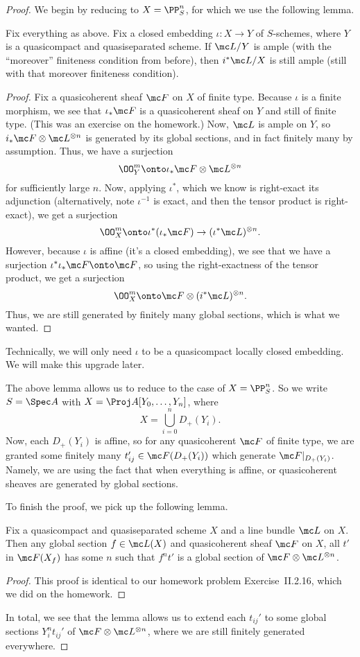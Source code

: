 \documentclass[../notes.tex]{subfiles}
\begin{document}
\begin{proof}
	We begin by reducing to $X=\PP^n_S$, for which we use the following lemma.
	\begin{lemma} %
		Fix everything as above. Fix a closed embedding $\iota\colon X\to Y$ of $S$-schemes, where $Y$ is a quasicompact and quasiseparated scheme. If $\mc L/Y$ is ample (with the ``moreover'' finiteness condition from before), then $i^*\mc L/X$ is still ample (still with that moreover finiteness condition).
	\end{lemma}
	\begin{proof}
		Fix a quasicoherent sheaf $\mc F$ on $X$ of finite type. Because $\iota$ is a finite morphism, we see that $\iota_*\mc F$ is a quasicoherent sheaf on $Y$ and still of finite type. (This was an exercise on the homework.) Now, $\mc L$ is ample on $Y$, so $i_*\mc F\otimes\mc L^{\otimes n}$ is generated by its global sections, and in fact finitely many by assumption. Thus, we have a surjection
		\[\OO_Y^m\onto\iota_*\mc F\otimes\mc L^{\otimes n}\]
		for sufficiently large $n$. Now, applying $\iota^*$, which we know is right-exact its adjunction (alternatively, note $\iota^{-1}$ is exact, and then the tensor product is right-exact), we get a surjection
		\[\OO_X^m\onto\iota^*(\iota_*\mc F)\to(\iota^*\mc L)^{\otimes n}.\]
		However, because $\iota$ is affine (it's a closed embedding), we see that we have a surjection $\iota^*\iota_*\mc F\onto\mc F$, so using the right-exactness of the tensor product, we get a surjection
		\[\OO_X^m\onto\mc F\otimes(i^*\mc L)^{\otimes n}.\]
		Thus, we are still generated by finitely many global sections, which is what we wanted.
	\end{proof}
	\begin{remark}
		Technically, we will only need $\iota$ to be a quasicompact locally closed embedding. We will make this upgrade later.
	\end{remark}
	The above lemma allows us to reduce to the case of $X=\PP^n_S$. So we write $S=\Spec A$ with $X=\Proj A[Y_0,\ldots,Y_n]$, where
	\[X=\bigcup_{i=0}^nD_+(Y_i).\]
	Now, each $D_+(Y_i)$ is affine, so for any quasicoherent $\mc F$ of finite type, we are granted some finitely many $t_{ij}'\in\mc F(D_+(Y_i))$ which generate $\mc F|_{D_+(Y_i)}$. Namely, we are using the fact that when everything is affine, or quasicoherent sheaves are generated by global sections.

	To finish the proof, we pick up the following lemma.
	\begin{lemma} \label{lem:extend-section}
		Fix a quasicompact and quasiseparated scheme $X$ and a line bundle $\mc L$ on $X$. Then any global section $f\in\mc L(X)$ and quasicoherent sheaf $\mc F$ on $X$, all $t'$in $\mc F(X_f)$ has some $n$ such that $f^nt'$ is a global section of $\mc F\otimes\mc L^{\otimes n}$.
	\end{lemma}
	\begin{proof}
		This proof is identical to our homework problem Exercise~II.2.16, which we did on the homework.
	\end{proof}
	In total, we see that the lemma allows us to extend each $t_{ij}'$ to some global sections $Y_i^nt_{ij}'$ of $\mc F\otimes\mc L^{\otimes n}$, where we are still finitely generated everywhere.
\end{proof}
\end{document}

